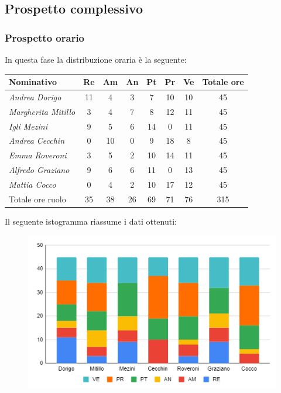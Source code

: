 {{{{{{{{{{{{{{{		\subsection{Prospetto complessivo}\label{PreventivoFaseDiProgettazioneDiDettaglioECodificaComplessivo}
	
			\subsubsection{Prospetto orario}\label{PreventivoFaseDiProgettazioneDiDettaglioECodificaProspettoOrario}
			In questa fase la distribuzione oraria è la seguente:
			\quad
			\def\tabularxcolumn#1{m{#1}}
			{
				
				\begin{center}
					\renewcommand{\arraystretch}{1.4}
					\begin{tabularx}{\textwidth}{|X|c|c|c|c|c|c|c|}
						\hline
						\rowcolor{airforceblue}
						\textbf{Nominativo} & \textbf{Re} & \textbf{Am} & \textbf{An} & \textbf{Pt} & \textbf{Pr} & \textbf{Ve} & \textbf{Totale ore}\\
						\hline
						\textit{Andrea Dorigo} & 11 & 4 & 3 & 7 & 10 & 10 & 45\\
						\hline
						\textit{Margherita Mitillo} & 3 & 4 & 7 & 8 & 12 & 11 & 45\\
						\hline
						\textit{Igli Mezini} & 9 & 5 & 6 & 14 & 0 & 11 & 45\\
						\hline
						\textit{Andrea Cecchin} & 0 & 10 & 0 & 9 & 18 & 8 & 45\\
						\hline
						\textit{Emma Roveroni} & 3 & 5 & 2 & 10 & 14 & 11 & 45\\
						\hline
						\textit{Alfredo Graziano} & 9 & 6 & 6 & 11 & 0 & 13 & 45\\
						\hline
						\textit{Mattia Cocco} & 0 & 4 & 2 & 10 & 17 & 12 & 45\\
						\hline
						Totale ore ruolo & 35 & 38 & 26 & 69 & 71 & 76 & 315\\
						\hline
					\end{tabularx}
				\end{center}
				Il seguente istogramma riassume i dati ottenuti:
				\begin{figure}[!h]
					\begin{center}
						\includegraphics[width=0.7\linewidth]{../immagini/pdp/istogramma_progettazione_dettaglio.png}

\end{center}
\end{figure}}}}}}}}}}}}}}}}}
